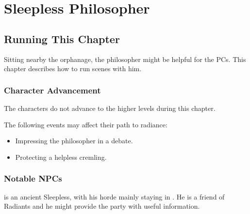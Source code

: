 \chapter{Sleepless Philosopher}
\label{chap:chapterSleepless}

\setcounter{section}{-1}
\section{Running This Chapter}

Sitting nearby the orphanage, \npcArclo{} the philosopher might be helpful for the PCs. This chapter describes how to run scenes with him.\\


\subsection{Character Advancement}

The characters do not advance to the higher levels during this chapter.

The following events may affect their path to radiance:
\begin{itemize}
	\item Impressing the philosopher in a debate.
	\item Protecting a helpless cremling.
\end{itemize}


\subsection{Notable NPCs}

\npcArclo{} is an ancient Sleepless, with his horde mainly staying in \locationYeddaw{}. He is a friend of Radiants and he might provide the party with useful information.




\newpage






